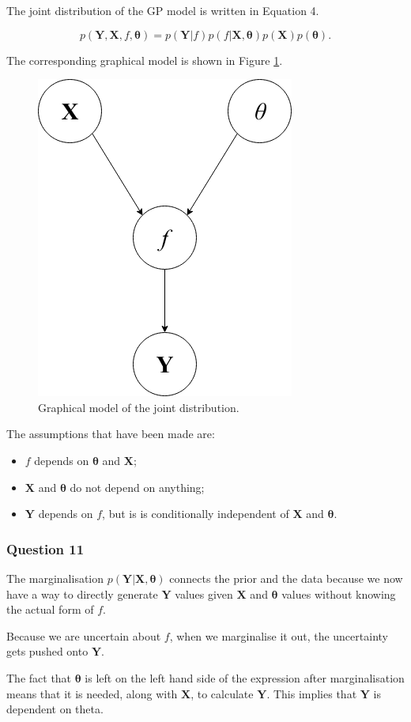 \documentclass[10pt, a4paper, twocolumn]{article} %
\begin{document}
The joint distribution of the GP model is written in Equation 4.

\begin{equation}
  p(\mathbf{Y},\mathbf{X}, f, \bm{\theta}) = p(\mathbf{Y}|f)p(f|\mathbf{X},\bm{\theta})p(\mathbf{X})p(\bm{\theta}).
\end{equation}

The corresponding graphical model is shown in Figure \ref{fig:q10}.

\begin{figure}[htbp]
\centerline{\includegraphics[width=0.5\linewidth]{question_10.png}}
\caption{Graphical model of the joint distribution.}
\label{fig:q10}
\end{figure}

The assumptions that have been made are:

\begin{itemize}
\item $f$ depends on $\bm{\theta}$ and $\mathbf{X}$;
\item $\mathbf{X}$ and $\bm{\theta}$ do not depend on anything;
\item $\mathbf{Y}$ depends on $f$, but is is conditionally independent of $\mathbf{X}$ and $\bm{\theta}$.
\end{itemize}

\subsubsection*{Question 11}

The marginalisation $p(\mathbf{Y|X,\bm{\theta}})$ connects the prior and the data because we now have a way to directly generate $\mathbf{Y}$ values given $\mathbf{X}$ and $\bm{\theta}$ values without knowing the actual form of $f$.
\par
Because we are uncertain about $f$, when we marginalise it out, the uncertainty gets pushed onto $\mathbf{Y}$.
\par
The fact that $\bm{\theta}$ is left on the left hand side of the expression after marginalisation means that it is needed, along with $\mathbf{X}$, to calculate $\mathbf{Y}$. This implies that $\mathbf{Y}$ is dependent on theta.
\end{document}
